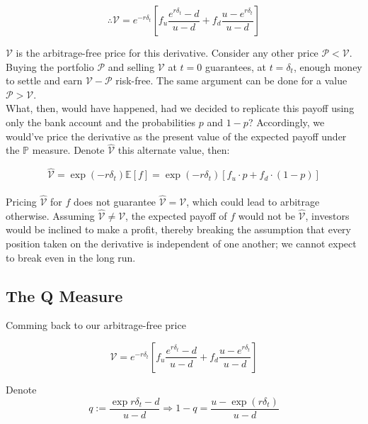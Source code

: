\documentclass{article}
\begin{document}
\begin{equation} \label{eq:v_price_complete}
    \therefore \mathcal{V} = e^{-r\delta_t}\left[f_u \frac{e^{r\delta_t} - d}{u - d} + f_d \frac{u - e^{r\delta_t}}{u-d}\right]
\end{equation}

$\mathcal{V}$ is the arbitrage-free price for this derivative. Consider any other price $\mathcal{P} < \mathcal{V}$. Buying the portfolio $\mathcal{P}$ and selling $\mathcal{V}$ at $t=0$ guarantees, at $t=\delta_t$, enough money to settle and earn $\mathcal{V}-\mathcal{P}$ risk-free. The same argument can be done for a value $\mathcal{P} > \mathcal{V}$.\\

What, then, would have happened, had we decided to replicate this payoff using only the bank account and the probabilities $p$ and $1-p$? Accordingly, we would've price the derivative as the present value of the expected payoff under the $\mathbb{P}$ measure. Denote $\hat{\mathcal{V}}$ this alternate value, then:

\begin{equation}
    \hat{\mathcal{V}} = \exp(-r\delta_t)\mathbb{E}[f] = \exp(-r\delta_t)[f_u \cdot p + f_d \cdot (1- p) ]
\end{equation}\\


Pricing $\hat{\mathcal{V}}$ for $f$ does not guarantee $\hat{\mathcal{V}} = \mathcal{V}$, which could lead to arbitrage otherwise. Assuming $\hat{\mathcal{V}} \neq \mathcal{V}$, the expected payoff of $f$ would not be $\hat{\mathcal{V}}$, investors would be inclined to make a profit, thereby breaking the assumption that every position taken on the derivative is independent of one another; we cannot expect to break even in the long run.


\subsection{The \Bbb Q Measure}
Comming back to our arbitrage-free price 

\begin{equation*}
    \mathcal{V} = e^{-r\delta_t}\left[f_u \frac{e^{r\delta_t} - d}{u - d} + f_d \frac{u - e^{r\delta_t}}{u-d}\right]
\end{equation*}

Denote
\begin{equation}
    q:= \frac{\exp{r\delta_t} - d}{u - d} \Longrightarrow 1-q = \frac{u - \exp{(r\delta_t)}}{u-d}
\end{equation}\\
\end{document}
